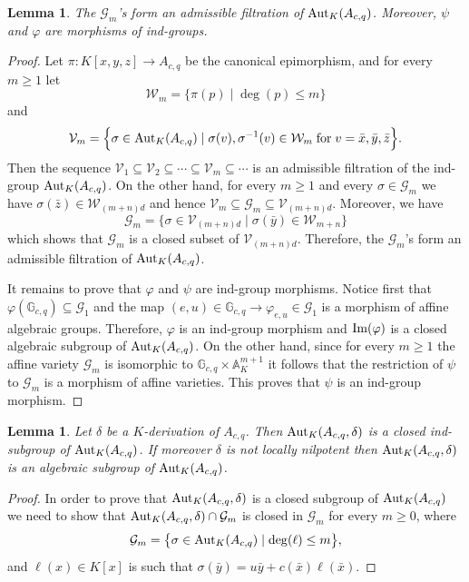 \documentclass{article}
\newcommand \G {\mathbb{G}}
\newcommand \V {\mathcal{V}}
\newcommand \W {\mathcal{W}}
\renewcommand \a {A}
\renewcommand \k {K}
\newcommand \affine {\mathbb{A}}
\newcommand \auto {{\rm Aut}}
\newcommand \image {{\rm Im}}
\newtheorem{lemma}[theorem]{Lemma}
\begin{document}
{\begin{lemma}\label{nestedStructure}The $\mathcal{G}_m$'s form an admissible filtration of $\auto_{\k}(\a_{c,q})$. Moreover, $\psi$ and $\varphi$ are morphisms of ind-groups.
\end{lemma}
\begin{proof}Let $\pi:\k[x,y,z]\longrightarrow\a_{c,q}$ be the canonical epimorphism, and for every $m\geq 1$ let $$\W_m=\big\{\pi(p)\mid \deg(p)\leq m \big\}$$ and $$\V_m=\Big\{\sigma\in\auto_{\k}(\a_{c,q})\mid \sigma(v),\sigma^{-1}(v)\in\W_m\; {\rm for}\; v=\bar{x},\bar{y},\bar{z} \Big\}.$$ Then the sequence $\V_1\subseteq \V_2\subseteq \cdots\subseteq \V_m\subseteq \cdots $ is an admissible filtration of the ind-group $\auto_{\k}(\a_{c,q})$. On the other hand, for every $m\geq 1$ and every $\sigma\in\mathcal{G}_m$ we have $\sigma(\bar{z})\in\W_{(m+n)d}$ and hence $\V_m\subseteq \mathcal{G}_m\subseteq \V_{(m+n)d}$. Moreover, we have $$\mathcal{G}_m=\Big\{ \sigma\in\V_{(m+n)d}\mid \sigma(\bar{y})\in\W_{m+n}\Big\}$$ which shows that $\mathcal{G}_m$ is a closed subset of $\V_{(m+n)d}$. Therefore, the $\mathcal{G}_m$'s form an admissible filtration of $\auto_{\k}(\a_{c,q})$.
	
	\smallskip It remains to prove that $\varphi$ and $\psi$ are ind-group morphisms. Notice first that $\varphi(\G_{c,q})\subseteq \mathcal{G}_1$ and the map $(e,u)\in\G_{c,q}\longrightarrow\varphi_{e,u}\in\mathcal{G}_1$ is a morphism of affine algebraic groups. Therefore, $\varphi$ is an ind-group morphism and $\image(\varphi)$ is a closed algebraic subgroup of $\auto_{\k}(\a_{c,q})$. On the other hand, since for every $m\geq 1$ the affine variety $\mathcal{G}_m$ is isomorphic to $\G_{c,q}\times \affine_{\k}^{m+1}$ it follows that the restriction of $\psi$ to $\mathcal{G}_m$ is a morphism of affine varieties. This proves that $\psi$ is an ind-group morphism.
\end{proof}

\begin{lemma}\label{closedSubgroup}Let $\delta$ be a $\k$-derivation of $\a_{c,q}$. Then $\auto_{\k}(\a_{c,q},\delta)$ is a closed ind-subgroup of $\auto_{\k}(\a_{c,q})$. If moreover $\delta$ is not locally nilpotent then $\auto_{\k}(\a_{c,q},\delta)$ is an algebraic subgroup of $\auto_{\k}(\a_{c,q})$.
\end{lemma}
\begin{proof}In order to prove that $\auto_{\k}(\a_{c,q},\delta)$ is a closed subgroup of $\auto_{\k}(\a_{c,q})$ we need to show that $\auto_{\k}(\a_{c,q},\delta)\cap \mathcal{G}_m$ is closed in $\mathcal{G}_m$ for every $m\geq 0$, where $$\mathcal{G}_m=\big\{ \sigma\in\auto_{\k}(\a_{c,q})\mid \deg(\ell)\leq m\big\},$$ and $\ell(x)\in\k[x]$ is such that $\sigma(\bar{y})=u\bar{y}+c(\bar{x})\ell(\bar{x})$.
	

\end{proof}}
\end{document}
